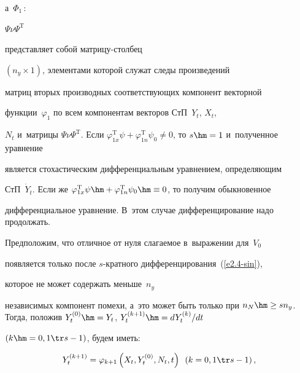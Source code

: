 а~$\Phi_1\,:$\linebreak\vspace*{-12pt}





\pagebreak 


\noindent


$\Psi \nu \Psi^{\mathrm{T}}$


 представляет собой мат\-ри\-цу-стол\-бец


$(n_y\times 1)$, элементами которой служат следы произведений


матриц вторых производных соответствующих компонент векторной


функции~$\varphi_1$ по всем компонентам векторов СтП~$Y_t$, $X_t$,


$N_t$ и~матрицы $\Psi\nu\Psi^{\mathrm{T}}$. Если $\varphi_{1x}^{\mathrm{T}} \psi


+\varphi_{1n}^{\mathrm{T}}\psi_0\ne 0$, то $s\hm=1$ и~полученное уравнение


является стохастическим дифференциальным уравнением, определяющим


СтП~$\dot Y_t$. Если же $\varphi_{1x}^{\mathrm{T}} \psi


\hm+\varphi_{1n}^{\mathrm{T}}\psi_0\hm\equiv 0$, то получим обыкновенное


дифференциальное уравнение. В~этом случае дифференцирование надо продолжать.





Предположим, что отличное от нуля слагаемое в~выражении для~$V_0$


появляется только после  $s$-крат\-но\-го дифференцирования~(\ref{e2.4-sin}), 


которое не может содержать меньше~$n_y$


независимых компонент помехи, а~это может быть только при $n_N\hm\ge


sn_y$. Тогда, положив $Y_t^{(0)} \hm= Y_t$, $Y_t^{(k+1)} \hm= dY_t^{(k)}/dt$ 


$(k\hm=0,1\tr s-1)$, будем иметь:





\noindent


    \begin{equation}


    Y_t^{(k+1)} = \varphi_{k+1} \left(X_t,Y_t^{(0)}, N_t,t\right)\enskip 


    (k=0,1\tr s-1)\,,\label{e4.3-sin}


    \end{equation}


